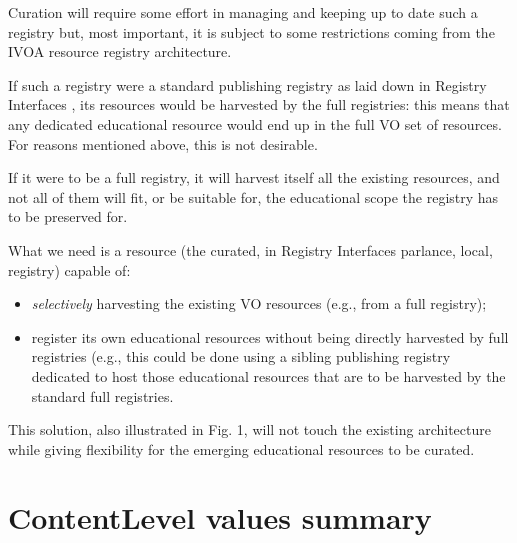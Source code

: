 \documentclass{ivoa}
\begin{document}
Curation will require some effort in managing and keeping up to date
such a registry but, most important, it is subject to  some restrictions coming from
the IVOA resource registry architecture. 
  


If such a registry were a standard publishing registry as laid down in
Registry Interfaces
\citep{2009ivoa.spec.1104B},
its resources would be harvested by the full registries: this means 
that any dedicated educational resource would end up in the full VO 
set of resources.  For reasons mentioned above, this is not
desirable.


If it were to be a full registry, it will harvest itself all the existing
resources, and not all of them will fit, or be suitable for, the educational
scope the registry has to be preserved for.
  


What we need is a resource (the curated, in Registry Interfaces
parlance, local, registry) capable of:
  
\begin{itemize}

\item 
\emph{selectively}
 harvesting the existing VO resources 
	(e.g., from a full registry);{}

\item register its own educational resources without being directly
	harvested by full registries (e.g., this could be done using a
	sibling publishing registry dedicated to host those educational
	resources that are to be harvested by the standard full registries.{}

\end{itemize}

This solution, also illustrated in Fig. 1, will not touch the existing architecture
while giving flexibility for the emerging educational resources to 
be curated.
  


\appendix

\section{ContentLevel values summary}

\label{app:clcurrval}
\end{document}
